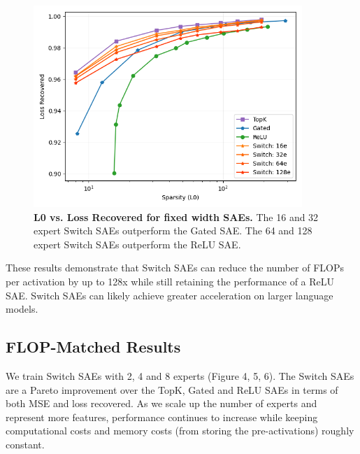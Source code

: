 \documentclass{article} %
\begin{document}
\begin{figure}[h]
\begin{center}
\includegraphics[width=4in]{fig/l0_lossrec.png}
\end{center}
\caption{\textbf{L0 vs. Loss Recovered for fixed width SAEs.} The 16 and 32 expert Switch SAEs outperform the Gated SAE. The 64 and 128 expert Switch SAEs outperform the ReLU SAE.}
\end{figure}

These results demonstrate that Switch SAEs can reduce the number of FLOPs per activation by up to 128x while still retaining the performance of a ReLU SAE. Switch SAEs can likely achieve greater acceleration on larger language models.

\subsection{FLOP-Matched Results}

We train Switch SAEs with 2, 4 and 8 experts (Figure 4, 5, 6). The Switch SAEs are a Pareto improvement over the TopK, Gated and ReLU SAEs in terms of both MSE and loss recovered. As we scale up the number of experts and represent more features, performance continues to increase while keeping computational costs and memory costs (from storing the pre-activations) roughly constant.
\end{document}

